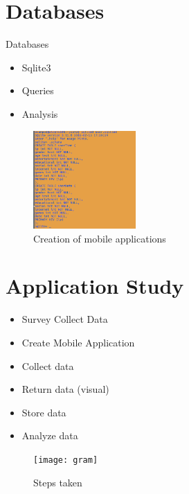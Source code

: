 \documentclass[handout,t]{beamer}
\begin{document}
\section{Databases}
\begin{frame}{Databases}
\begin{itemize}
\item Sqlite3
\item Queries 
\item Analysis
\end{itemize}

\begin{figure}
    \centering
    \includegraphics[width = 0.35\textwidth]{terminal}
    \caption{Creation of mobile applications }
  \end{figure}


\end{frame}

\section{Application Study}
\begin{frame} 
\begin{itemize}
   \item Survey Collect Data 
  \item Create Mobile Application
  \item Collect data
  \item Return data (visual) 
  \item Store data 
  \item Analyze data
 \end{itemize} 
 
 
 \begin{figure}
    \centering
    \texttt{[image: gram]}
    \caption{Steps taken }
  \end{figure}
      
    \end{frame}
\end{document}
